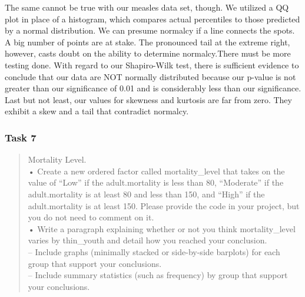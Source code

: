 \documentclass[
]{article}
\begin{document}
The same cannot be true with our measles data set, though. We utilized a
QQ plot in place of a histogram, which compares actual percentiles to
those predicted by a normal distribution. We can presume normalcy if a
line connects the spots. A big number of points are at stake. The
pronounced tail at the extreme right, however, casts doubt on the
ability to determine normalcy.There must be more testing done. With
regard to our Shapiro-Wilk test, there is sufficient evidence to
conclude that our data are NOT normally distributed because our p-value
is not greater than our significance of 0.01 and is considerably less
than our significance. Last but not least, our values for skewness and
kurtosis are far from zero. They exhibit a skew and a tail that
contradict normalcy.

\hypertarget{task-7}{%
\subsubsection{Task 7}\label{task-7}}

\begin{quote}
Mortality Level.\\
• Create a new ordered factor called mortality\_level that takes on the
value of ``Low'' if the adult.mortality is less than 80, ``Moderate'' if
the adult.mortality is at least 80 and less than 150, and ``High'' if
the adult.mortality is at least 150. Please provide the code in your
project, but you do not need to comment on it.\\
• Write a paragraph explaining whether or not you think mortality\_level
varies by thin\_youth and detail how you reached your conclusion.\\
-- Include graphs (minimally stacked or side-by-side barplots) for each
group that support your conclusions.\\
-- Include summary statistics (such as frequency) by group that support
your conclusions.
\end{quote}
\end{document}
